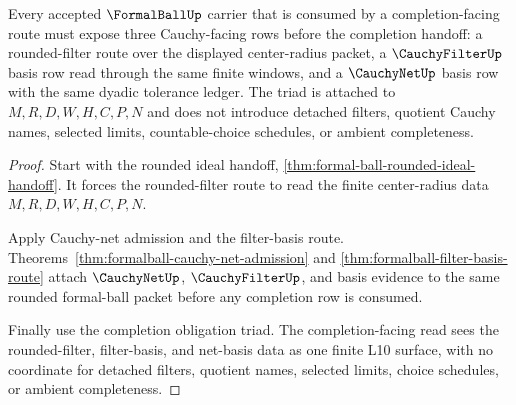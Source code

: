 \begin{theorem}
\label{thm:formalball-cauchy-filter-basis-triad}
Every accepted $\FormalBallUp$ carrier that is consumed by a completion-facing route must expose three Cauchy-facing rows before the completion handoff: a rounded-filter route over the displayed center-radius packet, a $\CauchyFilterUp$ basis row read through the same finite windows, and a $\CauchyNetUp$ basis row with the same dyadic tolerance ledger. The triad is attached to $M,R,D,W,H,C,P,N$ and does not introduce detached filters, quotient Cauchy names, selected limits, countable-choice schedules, or ambient completeness.
\end{theorem}
\begin{proof}
Start with the rounded ideal handoff, \autoref{thm:formal-ball-rounded-ideal-handoff}. It forces the rounded-filter route to read the finite center-radius data $M,R,D,W,H,C,P,N$.

Apply Cauchy-net admission and the filter-basis route. Theorems~\ref{thm:formalball-cauchy-net-admission} and \ref{thm:formalball-filter-basis-route} attach $\CauchyNetUp$, $\CauchyFilterUp$, and basis evidence to the same rounded formal-ball packet before any completion row is consumed.

Finally use the completion obligation triad. The completion-facing read sees the rounded-filter, filter-basis, and net-basis data as one finite L10 surface, with no coordinate for detached filters, quotient names, selected limits, choice schedules, or ambient completeness.
\end{proof}

